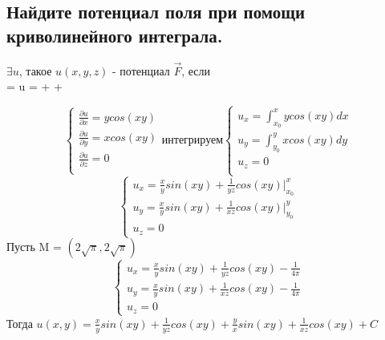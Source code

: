 \documentclass{article}
\begin{document}
    \subsection{Найдите потенциал поля при помощи криволинейного интеграла.}
    $\exists u$, такое $u(x,y,z)$ - потенциал $\overrightarrow{F}$, если \\
     =  u = \overrightarrow{} +  +  
    
    \begin{equation*}
        \begin{cases}
            \frac{\partial u}{\partial x} = y cos(xy) \\
            \frac{\partial u}{\partial y} = x cos(xy) \\
            \frac{\partial u}{\partial z} = 0\\
        \end{cases}
        \text{интегрируем}
        \begin{cases}
            u_x = \int_{x_0}^x y cos(xy) dx \\
            u_y = \int_{y_0}^y  x cos(xy) dy \\
            u_z = 0\\
        \end{cases}
    \end{equation*}
    \begin{equation*}
        \begin{cases}
            u_x = \frac{x}{y} sin(xy) + \frac{1}{yz} cos(xy) \bigg|_{x_0}^x \\
            u_y = \frac{x}{y} sin(xy) + \frac{1}{xz} cos(xy) \bigg|_{y_0}^y \\
            u_z = 0
        \end{cases}
    \end{equation*}
    Пусть M = $(2\sqrt{\pi}, 2\sqrt{\pi})$
    \begin{equation*}
        \begin{cases}
            u_x = \frac{x}{y} sin(xy) + \frac{1}{yz} cos(xy) - \frac{1}{4\pi} \\
            u_y = \frac{x}{y} sin(xy) + \frac{1}{xz} cos(xy) - \frac{1}{4\pi} \\
            u_z = 0
        \end{cases}
    \end{equation*}
    Тогда $u(x,y) = \frac{x}{y} sin(xy) + \frac{1}{yz} cos(xy) + \frac{y}{x} sin(xy) + \frac{1}{xz} cos(xy) + C$ \\
\end{document}
